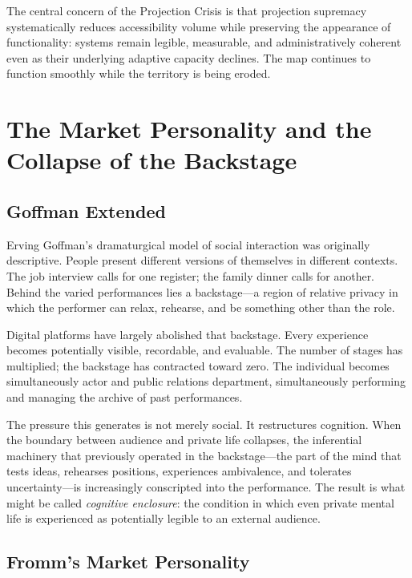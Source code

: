 \documentclass[12pt, a4paper]{article}
\theoremstyle{plain}
\theoremstyle{definition}
\theoremstyle{remark}
\begin{document}
The central concern of the Projection Crisis is that projection supremacy
systematically reduces accessibility volume while preserving the appearance of
functionality: systems remain legible, measurable, and administratively coherent
even as their underlying adaptive capacity declines.
The map continues to function smoothly while the territory is being eroded.

\section{The Market Personality and the Collapse of the Backstage}

\subsection{Goffman Extended}

Erving Goffman's dramaturgical model of social interaction was originally descriptive.
People present different versions of themselves in different contexts.
The job interview calls for one register; the family dinner calls for another.
Behind the varied performances lies a backstage---a region of relative privacy
in which the performer can relax, rehearse, and be something other than the role.

Digital platforms have largely abolished that backstage.
Every experience becomes potentially visible, recordable, and evaluable.
The number of stages has multiplied; the backstage has contracted toward zero.
The individual becomes simultaneously actor and public relations department,
simultaneously performing and managing the archive of past performances.

The pressure this generates is not merely social.
It restructures cognition.
When the boundary between audience and private life collapses, the inferential
machinery that previously operated in the backstage---the part of the mind that
tests ideas, rehearses positions, experiences ambivalence, and tolerates uncertainty---is
increasingly conscripted into the performance.
The result is what might be called \emph{cognitive enclosure}: the condition in
which even private mental life is experienced as potentially legible to an external audience.

\subsection{Fromm's Market Personality}
\end{document}
